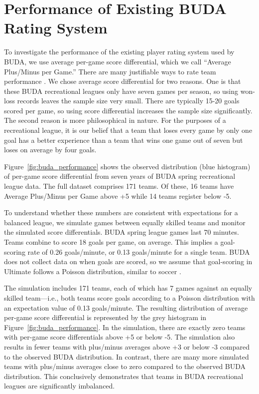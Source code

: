 \section{Performance of Existing BUDA Rating System}\label{sec:existing_performance}

To investigate the performance of the existing player rating system used by BUDA, we use average per-game score differential, which we call ``Average Plus/Minus per Game.'' There are many justifiable ways to rate team performance \cite{Langville_2012}.  We chose average score differential for two reasons.  One is that these BUDA recreational leagues only have seven games per season, so using won-loss records leaves the sample size very small.  There are typically 15-20 goals scored per game, so using score differential increases the sample size significantly.  The second reason is more philosophical in nature.  For the purposes of a recreational league, it is our belief that a team that loses every game by only one goal has a better experience than a team that wins one game out of seven but loses on average by four goals.  

Figure~\ref{fig:buda_performance} shows the observed distribution (blue histogram) of per-game score differential from seven years of BUDA spring recreational league data.  The full dataset comprises 171 teams.  Of these, 16 teams have Average Plus/Minus per Game above +5 while 14 teams register below -5.  

To understand whether these numbers are consistent with expectations for a balanced league, we simulate games between equally skilled teams and monitor the simulated score differentials.  BUDA spring league games last 70 minutes.  Teams combine to score 18 goals per game, on average. This implies a goal-scoring rate of 0.26 goals/minute, or 0.13 goals/minute for a single team.  BUDA does not collect data on when goals are scored, so we assume that goal-scoring in Ultimate follows a Poisson distribution, similar to soccer \cite{Heuer_2010}.

The simulation includes 171 teams, each of which has 7 games against an equally skilled team---i.e., both teams score goals according to a Poisson distribution with an expectation value of 0.13 goals/minute. The resulting distribution of average per-game score differential is represented by the grey histogram in Figure~\ref{fig:buda_performance}.  In the simulation, there are exactly zero teams with per-game score differentials above +5 or below -5.  The simulation also results in fewer teams with plus/minus averages above +3 or below -3 compared to the observed BUDA distribution.  In contrast, there are many more simulated teams with plus/minus averages close to zero compared to the observed BUDA distribution.  This conclusively demonstrates that teams in BUDA recreational leagues are significantly imbalanced.

